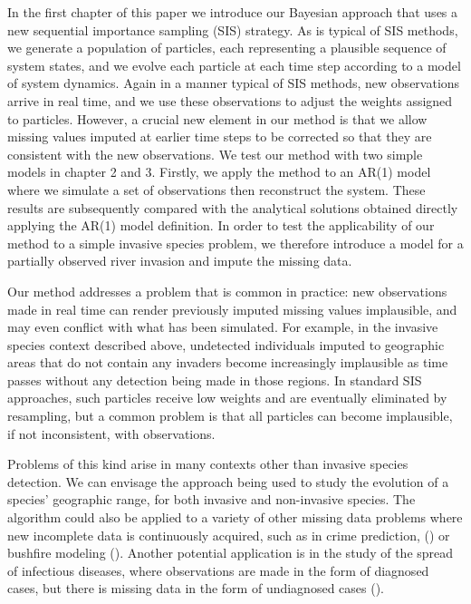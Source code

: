 In the first chapter of this paper we introduce our Bayesian approach that uses a new sequential importance sampling (SIS) strategy. As is typical of SIS methods, we generate a population of particles, each representing a plausible sequence of system states, and we evolve each particle at each time step according to a model of system dynamics. Again in a manner typical of SIS methods, new observations arrive in real time, and we use these observations to adjust the weights assigned to particles. However, a crucial new element in our method is that we allow missing values imputed at earlier time steps to be corrected so that they are consistent with the new observations. We test our method with two simple models in chapter 2 and 3. Firstly, we apply the method to an AR(1) model where we simulate a set of observations then reconstruct the system. These results are subsequently compared with the analytical solutions obtained directly applying the AR(1) model definition. In order to test the applicability of our method to a simple invasive species problem, we therefore introduce a model for a partially observed river invasion and impute the missing data.

Our method addresses a problem that is common in practice: new observations made in real time can render previously imputed missing values implausible, and may even conflict with what has been simulated. For example, in the invasive species context described above, undetected individuals imputed to geographic areas that do not contain any invaders become increasingly implausible as time passes without any detection being made in those regions. In standard SIS approaches, such particles receive low weights and are eventually eliminated by resampling, but a common problem is that all particles can become implausible, if not inconsistent, with observations.

Problems of this kind arise in many contexts other than invasive species detection. We can envisage the approach being used to study the evolution of a species' geographic range, for both invasive and non-invasive species. The algorithm could also be applied to a variety of other missing data problems where new incomplete data is continuously acquired, such as in crime prediction, (\cite{Malathi}) or bushfire modeling (\cite{Beer}). Another potential application is in the study of the spread of infectious diseases, where observations are made in the form of diagnosed cases, but there is missing data in the form of undiagnosed cases (\cite{O'Neill}). 

